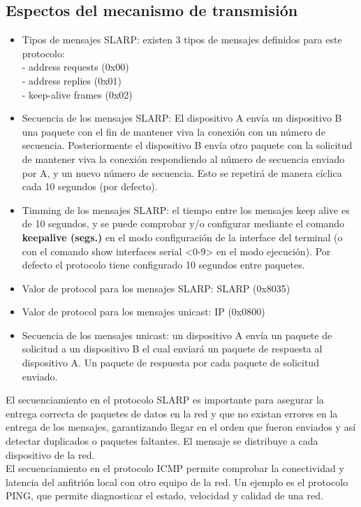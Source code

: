 \documentclass{article}
\begin{document}
    \subsection{Espectos del mecanismo de transmisión}
    \begin{itemize}
        \item Tipos de mensajes SLARP: existen 3 tipos de mensajes definidos para este protocolo:\\
        - address requests (0x00)\\
        - address replies (0x01)\\
        - keep-alive frames (0x02)
        \item Secuencia de los mensajes SLARP: El dispositivo A envía un dispositivo B una paquete con el fin de mantener viva la conexión con un número de secuencia. Posteriormente el dispositivo B envía otro paquete con la solicitud de mantener viva la conexión respondiendo al número de secuencia enviado por A, y un nuevo número de secuencia. Esto se repetirá de manera cíclica cada 10 segundos (por defecto).
        \item Timming de los mensajes SLARP: el tiempo entre los mensajes keep alive es de 10 segundos, y se puede comprobar y/o configurar mediante el comando {\bfseries keepalive (segs.)} en el modo configuración de la interface del terminal (o con el comando show interfaces serial <0-9> en el modo ejecución). Por defecto el protocolo tiene configurado 10 segundos entre paquetes.
        \item Valor de protocol para los mensajes SLARP: SLARP (0x8035)
        \item Valor de protocol para los mensajes unicast: IP (0x0800)
        \item Secuencia de los mensajes unicast: un dispositivo A envía un paquete de solicitud a un dispositivo B el cual enviará un paquete de respuesta al dispositivo A. Un paquete de respuesta por cada paquete de solicitud enviado.
    \end{itemize}

    El secuenciamiento en el protocolo SLARP es importante para asegurar la entrega correcta de paquetes de datos en la red y que no existan errores en la entrega de los mensajes, garantizando llegar en el orden que fueron enviados y así detectar duplicados o paquetes faltantes. El mensaje se distribuye a cada dispositivo de la red.\\
    El secuenciamiento en el protocolo ICMP permite comprobar la conectividad y latencia del anfitrión local con otro equipo de la red. Un ejemplo es el protocolo PING, que permite diagnosticar el estado, velocidad y calidad de una red.\\\\
\end{document}

